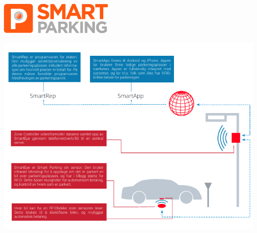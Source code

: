 \documentclass[xetex]{beamer}
\begin{document}
\begin{frame}
	\bigskip
	\vfill\hfill\includegraphics[scale=0.2]{grafikk/logoer/smartparking.png} \\ [-1em]
	\centerline{\includegraphics{grafikk/eksisterende_systemer/smartpark_smaller.pdf}}
\end{frame}
\end{document}
